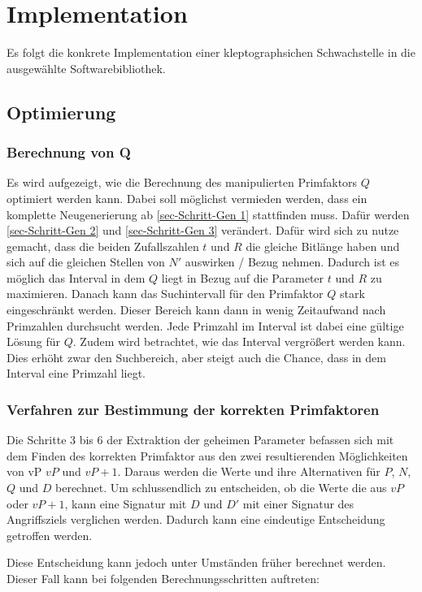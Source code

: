 \chapter{Implementation}
    Es folgt die konkrete Implementation einer kleptographsichen Schwachstelle in die ausgewählte Softwarebibliothek.

    \section{Optimierung}
        \subsection{Berechnung von Q}
            Es wird aufgezeigt, wie die Berechnung des manipulierten Primfaktors $Q$ optimiert werden kann. Dabei soll möglichst vermieden werden, dass ein komplette Neugenerierung ab \ref{sec-Schritt-Gen 1} stattfinden muss. Dafür werden \ref{sec-Schritt-Gen 2} und \ref{sec-Schritt-Gen 3} verändert. Dafür wird sich zu nutze gemacht, dass die beiden Zufallszahlen $t$ und $R$ die gleiche Bitlänge haben und sich auf die gleichen Stellen von $N'$ auswirken / Bezug nehmen. Dadurch ist es möglich das Interval in dem $Q$ liegt in Bezug auf die Parameter $t$ und $R$ zu maximieren. 
            Danach kann das Suchintervall für den Primfaktor $Q$ stark eingeschränkt werden. Dieser Bereich kann dann in wenig Zeitaufwand nach Primzahlen durchsucht werden. Jede Primzahl im Interval ist dabei eine gültige Lösung für $Q$. Zudem wird betrachtet, wie das Interval vergrößert werden kann. Dies erhöht zwar den Suchbereich, aber steigt auch die Chance, dass in dem Interval eine Primzahl liegt.

        \subsection{Verfahren zur Bestimmung der korrekten Primfaktoren}

            Die Schritte 3 bis 6 der Extraktion der geheimen Parameter befassen sich mit dem Finden des korrekten Primfaktor aus den zwei resultierenden Möglichkeiten von vP $vP$ und $vP+1$. Daraus werden die Werte und ihre Alternativen für $P$, $N$, $Q$ und $D$ berechnet. 
            Um schlussendlich zu entscheiden, ob die Werte die aus $vP$ oder $vP+1$, kann eine Signatur mit $D$ und $D'$ mit einer Signatur des Angriffsziels verglichen werden. Dadurch kann eine eindeutige Entscheidung getroffen werden. 

            Diese Entscheidung kann jedoch unter Umständen früher berechnet werden. Dieser Fall kann bei folgenden Berechnungsschritten  auftreten:

